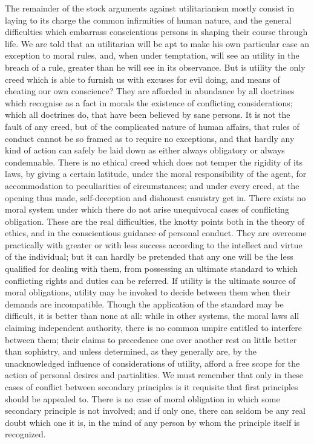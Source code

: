 \documentclass[12pt]{report}
\begin{document}
The remainder of the stock arguments against utilitarianism mostly consist in laying to its charge the common infirmities of human nature, and the general difficulties which embarrass conscientious persons in shaping their course through life. We are told that an utilitarian will be apt to make his own particular case an exception to moral rules, and, when under temptation, will see an utility in the breach of a rule, greater than he will see in its observance. But is utility the only creed which is able to furnish us with excuses for evil doing, and means of cheating our own conscience? They are afforded in abundance by all doctrines which recognise as a fact in morals the existence of conflicting considerations; which all doctrines do, that have been believed by sane persons. It is not the fault of any creed, but of the complicated nature of human affairs, that rules of conduct cannot be so framed as to require no exceptions, and that hardly any kind of action can safely be laid down as either always obligatory or always condemnable. There is no ethical creed which does not temper the rigidity of its laws, by giving a certain latitude, under the moral responsibility of the agent, for accommodation to peculiarities of circumstances; and under every creed, at the opening thus made, self-deception and dishonest casuistry get in. There exists no moral system under which there do not arise unequivocal cases of conflicting obligation. These are the real difficulties, the knotty points both in the theory of ethics, and in the conscientious guidance of personal conduct. They are overcome practically with greater or with less success according to the intellect and virtue of the individual; but it can hardly be pretended that any one will be the less qualified for dealing with them, from possessing an ultimate standard to which conflicting rights and duties can be referred. If utility is the ultimate source of moral obligations, utility may be invoked to decide between them when their demands are incompatible. Though the application of the standard may be difficult, it is better than none at all: while in other systems, the moral laws all claiming independent authority, there is no common umpire entitled to interfere between them; their claims to precedence one over another rest on little better than sophistry, and unless determined, as they generally are, by the unacknowledged influence of considerations of utility, afford a free scope for the action of personal desires and partialities. We must remember that only in these cases of conflict between secondary principles is it requisite that first principles should be appealed to. There is no case of moral obligation in which some secondary principle is not involved; and if only one, there can seldom be any real doubt which one it is, in the mind of any person by whom the principle itself is recognized.
\end{document}
